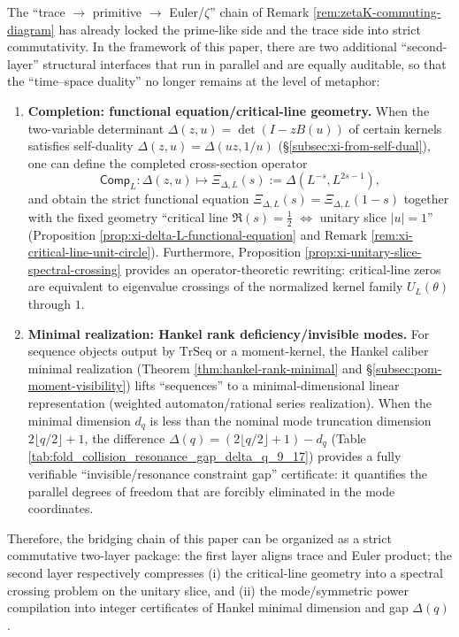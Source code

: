 \begin{remark}\label{rem:two_layer_bridge_package_completed_minH}
The ``trace $\to$ primitive $\to$ Euler/\(\zeta\)'' chain of Remark \ref{rem:zetaK-commuting-diagram} has already locked the prime-like side and the trace side into strict commutativity.
In the framework of this paper, there are two additional ``second-layer'' structural interfaces that run in parallel and are equally auditable, so that the ``time--space duality'' no longer remains at the level of metaphor:
\begin{enumerate}
  \item \textbf{Completion: functional equation/critical-line geometry.}
  When the two-variable determinant
  \(
  \Delta(z,u)=\det(I-zB(u))
  \)
  of certain kernels satisfies self-duality \(\Delta(z,u)=\Delta(uz,1/u)\) (\S\ref{subsec:xi-from-self-dual}),
  one can define the completed cross-section operator
  \[
  \mathsf{Comp}_L:\Delta(z,u)\longmapsto \Xi_{\Delta,L}(s):=\Delta(L^{-s},L^{2s-1}),
  \]
  and obtain the strict functional equation \(\Xi_{\Delta,L}(s)=\Xi_{\Delta,L}(1-s)\) together with
  the fixed geometry ``critical line \(\Re(s)=\tfrac12\) \(\Leftrightarrow\) unitary slice \(|u|=1\)'' (Proposition \ref{prop:xi-delta-L-functional-equation} and Remark \ref{rem:xi-critical-line-unit-circle}).
  Furthermore, Proposition \ref{prop:xi-unitary-slice-spectral-crossing} provides an operator-theoretic rewriting: critical-line zeros are equivalent to eigenvalue crossings of the normalized kernel family \(U_L(\theta)\) through \(1\).
  \item \textbf{Minimal realization: Hankel rank deficiency/invisible modes.}
  For sequence objects output by \(\mathrm{TrSeq}\) or a moment-kernel, the Hankel caliber minimal realization
  (Theorem \ref{thm:hankel-rank-minimal} and \S\ref{subsec:pom-moment-visibility})
  lifts ``sequences'' to a minimal-dimensional linear representation (weighted automaton/rational series realization).
  When the minimal dimension \(d_q\) is less than the nominal mode truncation dimension \(2\lfloor q/2\rfloor+1\),
  the difference \(\Delta(q)=(2\lfloor q/2\rfloor+1)-d_q\) (Table \ref{tab:fold_collision_resonance_gap_delta_q_9_17})
  provides a fully verifiable ``invisible/resonance constraint gap'' certificate: it quantifies the parallel degrees of freedom that are forcibly eliminated in the mode coordinates.
\end{enumerate}
Therefore, the bridging chain of this paper can be organized as a strict commutative two-layer package: the first layer aligns trace and Euler product; the second layer respectively compresses
(i) the critical-line geometry into a spectral crossing problem on the unitary slice, and
(ii) the mode/symmetric power compilation into integer certificates of Hankel minimal dimension and gap \(\Delta(q)\).
\end{remark}

